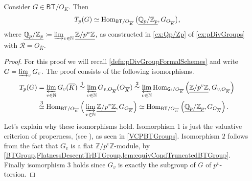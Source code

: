 \begin{prop}[]\label{AlternativeDefnTateModule}
	Consider $G \in \mathsf{BT}/O_K$.
	Then
	\begin{equation*}
		T_p(G) \simeq \operatorname{Hom}_{ \mathsf{BT}/O_{\overline{K}} }
		\big( \underline{\mathbb{Q}_p/\mathbb{Z}_{p}}, G_{O_{\overline{K}}} \big)
	,\end{equation*}
	where $\underline{\mathbb{Q}_p/\mathbb{Z}_{p}} \coloneqq \varinjlim_{v \in \mathbb{N}}
	\underline{\mathbb{Z}/p^n\mathbb{Z}}$, as constructed 
	in \cref{ex:Qp/Zp} of \cref{ex:pDivGroups} with $\mathscr{R} = O_{\overline{K}}$.
\end{prop}
\begin{proof}
	For this proof we will recall \cref{defn:pDivGroupFormalSchemes}
	and write $G = \varinjlim_v G_v$.
	The proof consists of the following isomorphisms.
	\begin{align*}
		T_p(G) &= \varprojlim_{v \in \mathbb{N}} G_v(\overline{K})
		\stackrel{1}{\simeq} \varprojlim_{v \in \mathbb{N}} G_{ v,O_{\overline{K}}}(O_{\overline{K}})
		\stackrel{2}{\simeq} \varprojlim_{v \in \mathbb{N}}
		\operatorname{Hom}_{ \mathsf{Gr}/O_{\overline{K}} }
		\left( \underline{\mathbb{Z}/p^v\mathbb{Z}}, G_{ v,O_{\overline{K}}} \right) \\
		&\stackrel{3}{\simeq} 
		\operatorname{Hom}_{ \mathsf{BT}/O_{\overline{K}} } 
		\Big( \varinjlim_{v \in \mathbb{N}} \underline{\mathbb{Z}/p^v\mathbb{Z}}, G_{O_{\overline{K}}} \Big)
		\simeq \operatorname{Hom}_{ \mathsf{BT}/O_{\overline{K}} } 
		\left( \underline{\mathbb{Q}_p/\mathbb{Z}_{p}}, G_{O_{\overline{K}}} \right)
	.\end{align*}
	Let's explain why these isomorphisms hold.
	Isomorphism $1$ is just 
	the valuative criterion of properness,
	(see \cite[Chapter II, theorem 4.7]{Hartshorne}),
	as seen in \cref{VCPBTGroups}.
	Isomorphism $2$ follows from the fact that $G_v$ is
	a flat $\mathbb{Z}/p^v\mathbb{Z}$-module, by 
	\cref{BTGroup,FlatnessDescentTrBTGroup,lem:equivCondTruncatedBTGroup}.
	Finally isomorphism $3$ holds since $G_v$ is exactly the
	subgroup of $G$ of $p^v$-torsion.
\end{proof}


